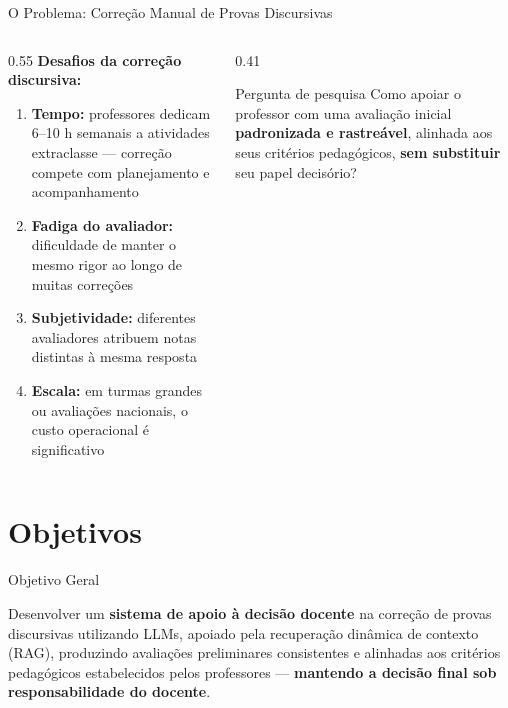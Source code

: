 \documentclass[10pt,aspectratio=169]{beamer}
\begin{document}
\begin{frame}{O Problema: Correção Manual de Provas Discursivas}
  \begin{columns}[T]
    \begin{column}{0.55\textwidth}
      \textbf{Desafios da correção discursiva:}
      \begin{enumerate}
        \item \textbf{Tempo:} professores dedicam \alert{6--10 h semanais} a atividades extraclasse \cite{barbosa2021} — correção compete com planejamento e acompanhamento
        \item \textbf{Fadiga do avaliador:} dificuldade de manter o mesmo rigor ao longo de muitas correções
        \item \textbf{Subjetividade:} diferentes avaliadores atribuem notas distintas à mesma resposta \cite{borges2017}
        \item \textbf{Escala:} em turmas grandes ou avaliações nacionais, o custo operacional é significativo
      \end{enumerate}
    \end{column}
    \begin{column}{0.41\textwidth}
      \begin{alertblock}{Pergunta de pesquisa}
        Como apoiar o professor com uma avaliação inicial \textbf{padronizada e rastreável}, alinhada aos seus critérios pedagógicos, \textbf{sem substituir} seu papel decisório?
      \end{alertblock}
    \end{column}
  \end{columns}
\end{frame}


\section{Objetivos}

\begin{frame}{Objetivo Geral}
  \begin{block}{}
    \large
    Desenvolver um \textbf{sistema de apoio à decisão docente} na correção de provas discursivas utilizando LLMs, apoiado pela recuperação dinâmica de contexto (RAG), produzindo avaliações preliminares consistentes e alinhadas aos critérios pedagógicos estabelecidos pelos professores --- \textbf{mantendo a decisão final sob responsabilidade do docente}.
  \end{block}
\end{frame}
\end{document}
